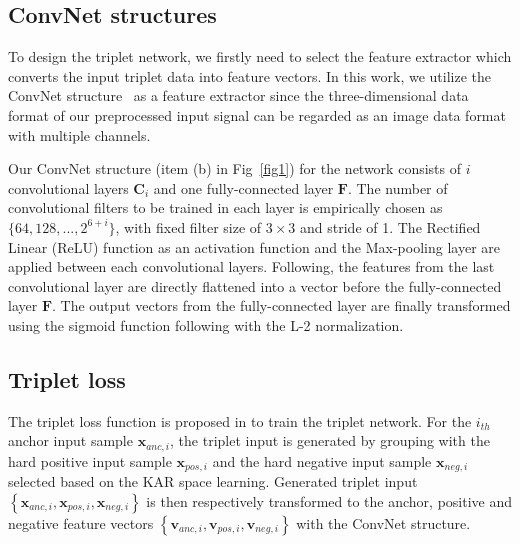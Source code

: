 \documentclass[runningheads]{llncs}
\begin{document}
\subsection{ConvNet structures}

To design the triplet network, we firstly need to select the feature extractor which converts the input triplet data into feature vectors. In this work, we utilize the ConvNet structure~\cite{lecun1998gradient} as a feature extractor since the three-dimensional data format of our preprocessed input signal can be regarded as an image data format with multiple channels. 

Our ConvNet structure (item (b) in Fig~\ref{fig1}) for the network consists of $i$ convolutional layers $\mathbf{C}_{i}$ and one fully-connected layer $\mathbf{F}$. The number of convolutional filters to be trained in each layer is empirically chosen as $\{64, 128, ...,  2^{6+i}\}$, with fixed filter size of $3\times3$ and stride of 1. The Rectiﬁed Linear (ReLU) function as an activation function and the Max-pooling layer are applied between each convolutional layers. Following, the features from the last convolutional layer are directly flattened into a vector before the fully-connected layer $\mathbf{F}$.
The output vectors from the fully-connected layer are finally transformed using the sigmoid function following with the L-2 normalization.


\subsection{Triplet loss}

The triplet loss function is proposed in \cite{hoffer2015deep} to train the triplet network.
For the $i_{th}$ anchor input sample $\mathbf{x}_{anc,i}$, the triplet input is generated by grouping with the hard positive input sample $\mathbf{x}_{pos,i}$ and the hard negative input sample $\mathbf{x}_{neg,i}$ selected based on the KAR space learning. Generated triplet input $\left\{\mathbf{x}_{anc,i},\mathbf{x}_{pos,i},\mathbf{x}_{neg,i}\right\}$ is then respectively transformed to the anchor, positive and negative feature vectors $\left\{\mathbf{v}_{anc,i},\mathbf{v}_{pos,i},\mathbf{v}_{neg,i}\right\}$ with the ConvNet structure.
\end{document}
